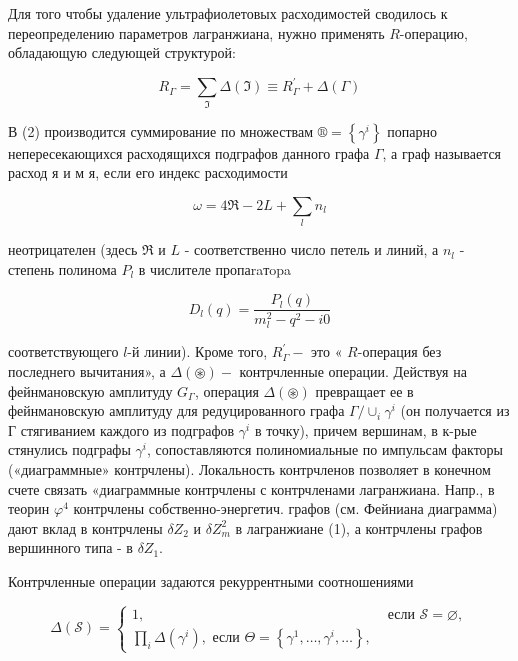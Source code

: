 \documentclass[10pt]{article}
\begin{document}
Для того чтобы удаление ультрафиолетовых расходимостей сводилось к переопределению параметров лагранжиана, нужно применять $R$-операцию, обладающую следующей структурой:



\[

R_{\Gamma}=\sum_{\Im} \Delta(\Im) \equiv R_{\Gamma}^{\prime}+\Delta(\Gamma)

\]



В (2) производится суммирование по множествам $®=\left\{\gamma^{i}\right\}$ попарно непересекающихся расходящихся подграфов данного графа $\Gamma$, а граф называется расход я и м я, если его индекс расходимости



\[

\omega=4 \Re-2 L+\sum_{l} n_{l}

\]



неотрицателен (здесь $\Re$ и $L$ - соответственно число петель и линий, а $n_{l}$ - степень полинома $P_{l}$ в числителе пропаraтopa



\[

D_{l}(q)=\frac{P_{l}(q)}{m_{l}^{2}-q^{2}-i 0}

\]



соответствующего $l$-й линии). Кроме того, $R_{\Gamma}^{\prime}-$ это « $R$-операция без последнего вычитания», а $\Delta(\circledast)-$ контрчленные операции. Действуя на фейнмановскую амплитуду $G_{\Gamma}$, операция $\Delta(\circledast)$ превращает ее в фейнмановскую амплитуду для редуцированного графа $\Gamma / \cup_{i} \gamma^{i}$ (он получается из Г стягиванием каждого из подграфов $\gamma^{i}$ в точку), причем вершинам, в к-рые стянулись подграфы $\gamma^{i}$, сопоставляются полиномиальные по импульсам факторы («диаграммные» контрчлены). Локальность контрчленов позволяет в конечном счете связать «диаграммные контрчлены с контрчленами лагранжиана. Напр., в теорин $\varphi^{4}$ контрчлены собственно-энергетич. графов (см. Фейниана диаграмма) дают вклад в контрчлены $\delta Z_{2}$ и $\delta Z_{m}^{2}$ в лагранжиане (1), а контрчлены графов вершинного типа - в $\delta Z_{1}$.



Контрчленные операции задаются рекуррентными соотношениями



\[

\Delta(\mathscr{S})= \begin{cases}1, & \text { если } \mathscr{S}=\varnothing, \\ \prod_{i} \Delta\left(\gamma^{i}\right), \text { если } \mathscr{\Theta}=\left\{\gamma^{1}, \ldots, \gamma^{i}, \ldots\right\},\end{cases}

\]
\end{document}
